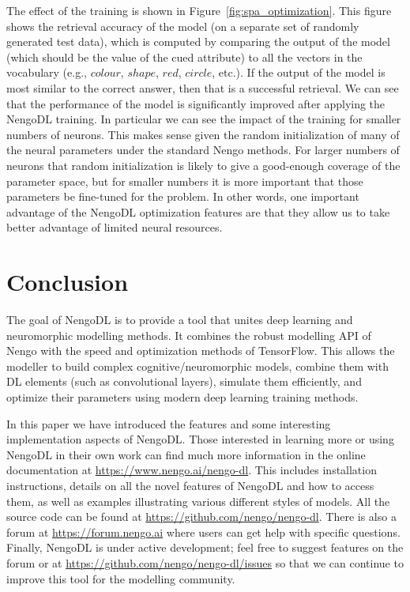 \documentclass{article}
\begin{document}
The effect of the training is shown in Figure~\ref{fig:spa_optimization}.  This figure shows the retrieval accuracy of the model (on a separate set of randomly generated test data), which is computed by comparing the output of the model (which should be the value of the cued attribute) to all the vectors in the vocabulary (e.g., $colour$, $shape$, $red$, $circle$, etc.).  If the output of the model is most similar to the correct answer, then that is a successful retrieval.  We can see that the performance of the model is significantly improved after applying the NengoDL training.  In particular we can see the impact of the training for smaller numbers of neurons.  This makes sense given the random initialization of many of the neural parameters under the standard Nengo methods. For larger numbers of neurons that random initialization is likely to give a good-enough coverage of the parameter space, but for smaller numbers it is more important that those parameters be fine-tuned for the problem.  In other words, one important advantage of the NengoDL optimization features are that they allow us to take better advantage of limited neural resources.

\section{Conclusion}

The goal of NengoDL is to provide a tool that unites deep learning and neuromorphic modelling methods.  It combines the robust modelling API of Nengo with the speed and optimization methods of TensorFlow.  This allows the modeller to build complex cognitive/neuromorphic models, combine them with DL elements (such as convolutional layers), simulate them efficiently, and optimize their parameters using modern deep learning training methods.

In this paper we have introduced the features and some interesting implementation aspects of NengoDL.  Those interested in learning more or using NengoDL in their own work can find much more information in the online documentation at \url{https://www.nengo.ai/nengo-dl}.  This includes installation instructions, details on all the novel features of NengoDL and how to access them, as well as examples illustrating various different styles of models.  All the source code can be found at \url{https://github.com/nengo/nengo-dl}.  There is also a forum at \url{https://forum.nengo.ai} where users can get help with specific questions.  Finally, NengoDL is under active development; feel free to suggest features on the forum or at \url{https://github.com/nengo/nengo-dl/issues} so that we can continue to improve this tool for the modelling community.
\end{document}
